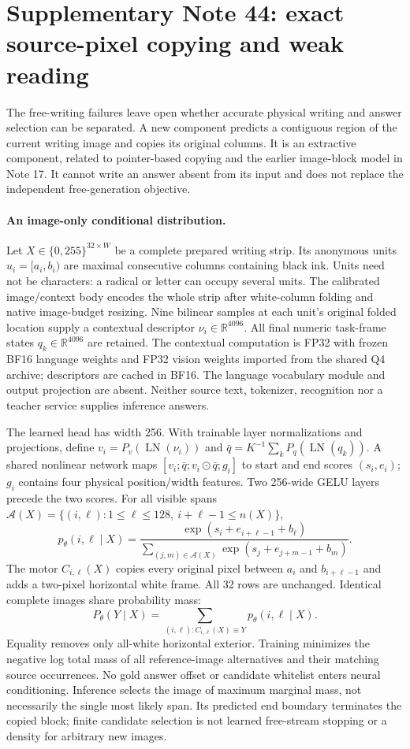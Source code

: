 \clearpage
\section*{Supplementary Note 44: exact source-pixel copying and weak reading}
The free-writing failures leave open whether accurate physical writing and
answer selection can be separated. A new component predicts a contiguous
region of the current writing image and copies its original columns. It is
an extractive component, related to pointer-based copying\cite{pointer} and
the earlier image-block model in Note 17. It cannot write an answer absent
from its input and does not replace the independent free-generation objective.

\paragraph{An image-only conditional distribution.}
Let $X\in\{0,255\}^{32\times W}$ be a complete prepared writing strip.
Its anonymous units $u_i=[a_i,b_i)$ are maximal consecutive columns containing
black ink. Units need not be characters: a radical or letter can occupy
several units. The calibrated image/context body\cite{qwen3vl} encodes the
whole strip after white-column folding and native image-budget resizing.
Nine bilinear samples at each unit's original folded location supply a
contextual descriptor $\nu_i\in\mathbb R^{4096}$. All final numeric task-frame
states $q_k\in\mathbb R^{4096}$ are retained. The contextual computation is
FP32 with frozen BF16 language weights and FP32 vision weights imported from
the shared Q4 archive; descriptors are cached in BF16. The language vocabulary
module and output projection are absent. Neither source text, tokenizer,
recognition nor a teacher service supplies inference answers.

The learned head has width 256. With trainable layer normalizations and
projections, define $v_i=P_v(\operatorname{LN}(\nu_i))$ and
$\bar q=K^{-1}\sum_k P_q(\operatorname{LN}(q_k))$. A shared nonlinear network
maps $[v_i;\bar q;v_i\odot\bar q;g_i]$ to start and end scores $(s_i,e_i)$;
$g_i$ contains four physical position/width features. Two 256-wide GELU
layers precede the two scores. For all visible spans
$\mathcal A(X)=\{(i,\ell):1\leq\ell\leq128,\ i+\ell-1\leq n(X)\}$,
\[
 p_\theta(i,\ell\mid X)=
 \frac{\exp(s_i+e_{i+\ell-1}+b_\ell)}
 {\sum_{(j,m)\in\mathcal A(X)}\exp(s_j+e_{j+m-1}+b_m)}.
\]
The motor $C_{i,\ell}(X)$ copies every original pixel between $a_i$ and
$b_{i+\ell-1}$ and adds a two-pixel horizontal white frame. All 32 rows are
unchanged. Identical complete images share probability mass:
\[
 P_\theta(Y\mid X)=\sum_{(i,\ell):C_{i,\ell}(X)\equiv Y}
                         p_\theta(i,\ell\mid X).
\]
Equality removes only all-white horizontal exterior. Training minimizes
the negative log total mass of all reference-image alternatives and their
matching source occurrences. No gold answer offset or candidate whitelist
enters neural conditioning. Inference selects the image of maximum marginal
mass, not necessarily the single most likely span. Its predicted end boundary
terminates the copied block; finite candidate selection is not learned
free-stream stopping or a density for arbitrary new images.


